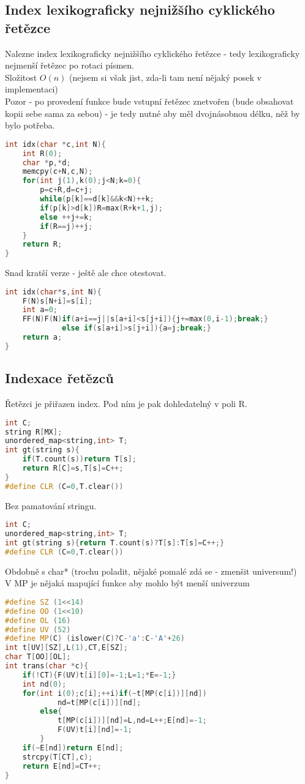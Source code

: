 \documentclass[11pt]{article}
\begin{document}
\subsection{Index lexikograficky nejnižšího cyklického řetězce}
Nalezne index lexikograficky nejnižšího cyklického řetězce - tedy lexikograficky nejmenší řetězec po rotaci písmen.
\\Složitost $O(n)$ (nejsem si však jist, zda-li tam není nějaký posek v implementaci)
\\Pozor - po provedení funkce bude vstupní řetězec znetvořen (bude obsahovat kopii sebe sama za sebou) - je tedy nutné aby měl dvojnásobnou délku, něž by bylo potřeba.
\begin{lstlisting}[language=C++]
int idx(char *c,int N){
    int R(0);
    char *p,*d;
    memcpy(c+N,c,N);
    for(int j(1),k(0);j<N;k=0){
        p=c+R,d=c+j;
        while(p[k]==d[k]&&k<N)++k;
        if(p[k]>d[k])R=max(R+k+1,j);
        else ++j+=k;
        if(R==j)++j;
    }
    return R;
}
\end{lstlisting}
Snad kratší verze - ještě ale chce otestovat.
\begin{lstlisting}[language=C++]
int idx(char*s,int N){
    F(N)s[N+i]=s[i];
    int a=0;
    FF(N)F(N)if(a+i==j||s[a+i]<s[j+i]){j+=max(0,i-1);break;}
             else if(s[a+i]>s[j+i]){a=j;break;}
    return a;
}
\end{lstlisting}
\subsection{Indexace řetězců}
Řetězci je přiřazen index. Pod ním je pak dohledatelný v poli \textsf{R}.
\begin{lstlisting}[language=C++]
int C;
string R[MX];
unordered_map<string,int> T;
int gt(string s){
    if(T.count(s))return T[s];
    return R[C]=s,T[s]=C++;
}
#define CLR (C=0,T.clear())
\end{lstlisting}
Bez pamatování stringu.
\begin{lstlisting}[language=C++]
int C;
unordered_map<string,int> T;
int gt(string s){return T.count(s)?T[s]:T[s]=C++;}
#define CLR (C=0,T.clear())
\end{lstlisting}
Obdobně s char* (trochu poladit, nějaké pomalé zdá se - zmenšit universum!)
\\V MP je nějaká mapující funkce aby mohlo být menší univerzum
\begin{lstlisting}[language=C++]
#define SZ (1<<14)
#define OO (1<<10)
#define OL (16)
#define UV (52)
#define MP(C) (islower(C)?C-'a':C-'A'+26)
int t[UV][SZ],L(1),CT,E[SZ];
char T[OO][OL];
int trans(char *c){
    if(!CT){F(UV)t[i][0]=-1;L=1;*E=-1;}
    int nd(0);
    for(int i(0);c[i];++i)if(~t[MP(c[i])][nd])
            nd=t[MP(c[i])][nd];
        else{
            t[MP(c[i])][nd]=L,nd=L++;E[nd]=-1;
            F(UV)t[i][nd]=-1;
        }
    if(~E[nd])return E[nd];
    strcpy(T[CT],c);
    return E[nd]=CT++;
}   
\end{lstlisting}
\end{document}
